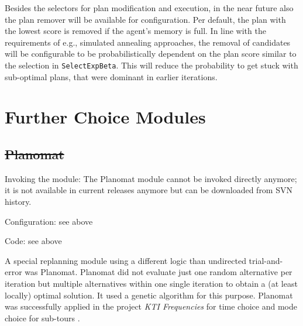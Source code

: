Besides the selectors for plan modification and execution, in the near future also the plan remover will be available for configuration. Per default, the plan with the lowest score is removed if the agent's memory is full. In line with the requirements of e.g., simulated annealing approaches, the removal of candidates will be configurable to be probabilistically dependent on the plan score similar to the selection in \lstinline|SelectExpBeta|. This will reduce the probability to get stuck with sub-optimal plans, that were dominant in earlier iterations.

\section{Further Choice Modules}
\label{sec:furtherchoicemodules}
\subsection{\st{Planomat}}
\label{sec:planomat}


{\color{lightgray}\tiny

\begin{compactitem}
\item Invoking the module: The Planomat module cannot be invoked directly anymore; it is not available in current releases anymore but can be downloaded from SVN history. 
\item Configuration: see above
\item Code: see above
\end{compactitem}

A special replanning module using a different logic than undirected trial-and-error was Planomat. Planomat did not evaluate just one random alternative per iteration but multiple alternatives within one single iteration to obtain a (at least locally) optimal solution. It used a genetic algorithm \citep[][]{MeisterEtAl_IATBR_2006, MeisterEtAl_STRC_2006, Meister_PhDThesis_2011} for this purpose. Planomat was successfully applied in the project \emph{KTI Frequencies} for time choice and mode choice for sub-tours \citep[][p.10]{BalmerEtAl_ResRep_datapuls_2010}.

}

